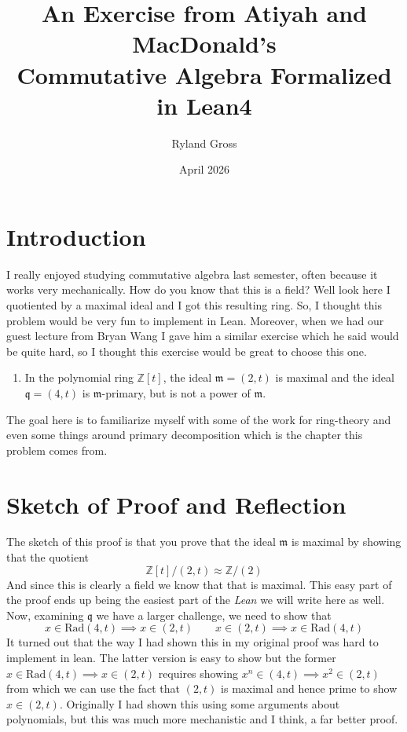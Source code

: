 \documentclass{article}
\title{An Exercise from Atiyah and MacDonald's \\ Commutative Algebra Formalized in Lean4}
\author{Ryland Gross}
\date{April 2026}
\begin{document}
\maketitle

\section{Introduction}

I really enjoyed studying commutative algebra last semester, often because it works very mechanically. How do you know that this is a field? Well look here I quotiented by a maximal ideal and I got this resulting ring. So, I thought this problem would be very fun to implement in Lean. Moreover, when we had our guest lecture from Bryan Wang I gave him a similar exercise which he said would be quite hard, so I thought this exercise would be great to choose this one. 

\begin{enumerate}

\item In the polynomial ring $\mathbb{Z}[t]$, the ideal 
$
\mathfrak{m} = (2,t)$
is maximal and the ideal 
$
\mathfrak{q} = (4,t)
$
is $\mathfrak{m}$-primary, but is not a power of $\mathfrak{m}$.

\end{enumerate}

The goal here is to familiarize myself with some of the work for ring-theory and even some things around primary decomposition which is the chapter this problem comes from. 

\section{Sketch of Proof and Reflection}

The sketch of this proof is that you prove that the ideal $\mathfrak{m}$ is maximal by showing that the quotient $$\mathbb{Z}[t]/(2,t) \approx \mathbb{Z}/(2)$$ And since this is clearly a field we know that that is maximal. This easy part of the proof ends up being the easiest part of the \emph{Lean} we will write here as well. Now, examining $\mathfrak{q}$ we have a larger challenge, we need to show that $$x \in \text{Rad}(4,t) \implies x \in (2,t) \qquad x \in (2,t) \implies x \in \text{Rad}(4,t)$$ It turned out that the way I had shown this in my original proof was hard to implement in lean. The latter version is easy to show but the former $x \in \text{Rad}(4,t) \implies x \in (2,t)$ requires showing $x^n \in (4,t) \implies x^2 \in (2,t)$ from which we can use the fact that $(2,t)$ is maximal and hence prime to show $x \in (2,t)$. Originally I had shown this using some arguments about polynomials, but this was much more mechanistic and I think, a far better proof. 
\end{document}
